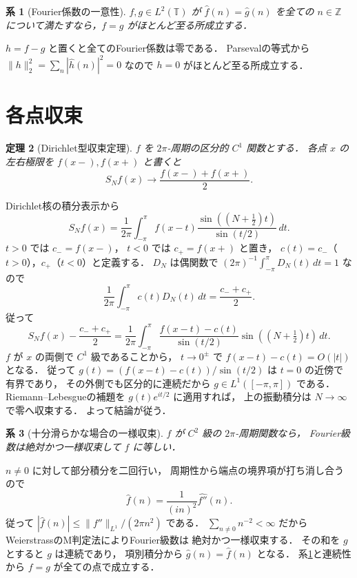 \documentclass[a5paper,10pt,onecolumn]{jsarticle}
\makeatletter
\theoremstyle{mathnotetheorem}
\newtheorem{theorem}{定理}[section]
\newtheorem{corollary}[theorem]{系}
\renewcommand{\proofname}{証明}
\renewenvironment{proof}[1][\proofname]{%
  \par\pushQED{\qed}\normalfont\topsep4\p@\@plus2\p@\relax
  \trivlist\item[\hskip\labelsep\bfseries #1]\ignorespaces
}{\popQED\endtrivlist\@endpefalse}
\newcommand{\norm}[1]{\lVert #1\rVert}
\makeatother
\begin{document}
\begin{corollary}[Fourier係数の一意性]\label{cor:fourier-unique}
$f,g\in L^2(\mathbb T)$ が
$\widehat f(n)=\widehat g(n)$ を全ての $n\in\mathbb Z$
について満たすなら，$f=g$ がほとんど至る所成立する．
\end{corollary}
\begin{proof}
$h=f-g$ と置くと全てのFourier係数は零である．
Parsevalの等式から
$\norm h_2^2=\sum_n|\widehat h(n)|^2=0$ なので
$h=0$ がほとんど至る所成立する．
\end{proof}

\section{各点収束}

\begin{theorem}[Dirichlet型収束定理]\label{thm:dirichlet}
$f$ を $2\pi$-周期の区分的 $C^1$ 関数とする．
各点 $x$ の左右極限を $f(x-),f(x+)$ と書くと
\[
 S_Nf(x)\longrightarrow\frac{f(x-)+f(x+)}2.
\]
\end{theorem}
\begin{proof}
Dirichlet核の積分表示から
\[
 S_Nf(x)=\frac1{2\pi}\int_{-\pi}^\pi
 f(x-t)\frac{\sin((N+\frac12)t)}{\sin(t/2)}\,dt.
\]
$t>0$ では $c_-=f(x-)$，
$t<0$ では $c_+=f(x+)$ と置き，
$c(t)=c_-$（$t>0$），$c_+$（$t<0$）と定義する．
$D_N$ は偶関数で
$(2\pi)^{-1}\int_{-\pi}^\pi D_N(t)\,dt=1$ なので
\[
 \frac1{2\pi}\int_{-\pi}^\pi c(t)D_N(t)\,dt
 =\frac{c_-+c_+}2.
\]
従って
\[
 S_Nf(x)-\frac{c_-+c_+}2
 =\frac1{2\pi}\int_{-\pi}^\pi
 \frac{f(x-t)-c(t)}{\sin(t/2)}
 \sin((N+\tfrac12)t)\,dt.
\]
$f$ が $x$ の両側で $C^1$ 級であることから，
$t\to0^\pm$ で
$f(x-t)-c(t)=O(|t|)$ となる．
従って
$g(t)=(f(x-t)-c(t))/\sin(t/2)$ は
$t=0$ の近傍で有界であり，
その外側でも区分的に連続だから
$g\in L^1([-\pi,\pi])$ である．
Riemann--Lebesgueの補題を
$g(t)e^{it/2}$ に適用すれば，
上の振動積分は $N\to\infty$ で零へ収束する．
よって結論が従う．
\end{proof}

\begin{corollary}[十分滑らかな場合の一様収束]\label{cor:uniform}
$f$ が $C^2$ 級の $2\pi$-周期関数なら，
Fourier級数は絶対かつ一様収束して $f$ に等しい．
\end{corollary}
\begin{proof}
$n\ne0$ に対して部分積分を二回行い，
周期性から端点の境界項が打ち消し合うので
\[
 \widehat f(n)=\frac1{(in)^2}\widehat{f''}(n).
\]
従って
$|\widehat f(n)|\le\norm{f''}_{L^1}/(2\pi n^2)$ である．
$\sum_{n\ne0}n^{-2}<\infty$ だから
WeierstrassのM判定法によりFourier級数は
絶対かつ一様収束する．
その和を $g$ とすると $g$ は連続であり，
項別積分から $\widehat g(n)=\widehat f(n)$ となる．
系\ref{cor:fourier-unique}と連続性から
$f=g$ が全ての点で成立する．
\end{proof}
\end{document}
